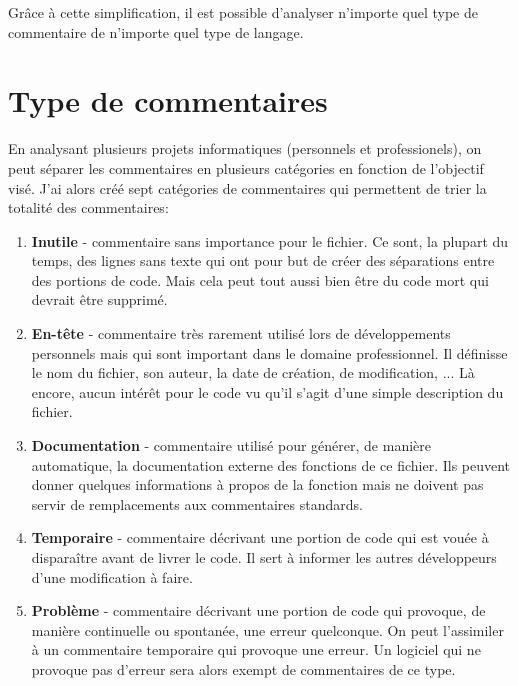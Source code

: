 \documentclass[10pt,a4paper,twoside, openany]{report}
\begin{document}
Gr\^ace \`a cette simplification, il est possible d'analyser n'importe quel type de commentaire de n'importe quel type de langage.

\section{Type de commentaires}

En analysant plusieurs projets informatiques (personnels et professionels), on peut s\'eparer les commentaires en plusieurs cat\'egories en fonction de l'objectif vis\'e. J'ai alors cr\'e\'e sept cat\'egories de commentaires qui permettent de trier la totalit\'e des commentaires:

\begin{enumerate}
\item{\textbf{Inutile} - commentaire sans importance pour le fichier. Ce sont, la plupart du temps, des lignes sans texte qui ont pour but de cr\'eer des s\'eparations entre des portions de code. Mais cela peut tout aussi bien \^etre du code mort qui devrait \^etre supprim\'e.\newline}
\item{\textbf{En-t\^ete} - commentaire tr\`es rarement utilis\'e lors de d\'eveloppements personnels mais qui sont important dans le domaine professionnel. Il d\'efinisse le nom du fichier, son auteur, la date de cr\'eation, de modification, ... L\`a encore, aucun int\'er\^et pour le code vu qu'il s'agit d'une simple description du fichier.\newline}
\item{\textbf{Documentation} - commentaire utilis\'e pour g\'en\'erer, de mani\`ere automatique, la documentation externe des fonctions de ce fichier. Ils peuvent donner quelques informations \`a propos de la fonction mais ne doivent pas servir de remplacements aux commentaires standards.\newline}
\item{\textbf{Temporaire} - commentaire d\'ecrivant une portion de code qui est vou\'ee \`a dispara\^itre avant de livrer le code. Il sert \`a informer les autres d\'eveloppeurs d'une modification \`a faire.\newline}
\item{\textbf{Probl\`eme} - commentaire d\'ecrivant une portion de code qui provoque, de mani\`ere continuelle ou spontan\'ee, une erreur quelconque. On peut l'assimiler \`a un commentaire temporaire qui provoque une erreur. Un logiciel qui ne provoque pas d'erreur sera alors exempt de commentaires de ce type.\newline}

\end{enumerate}
\end{document}
